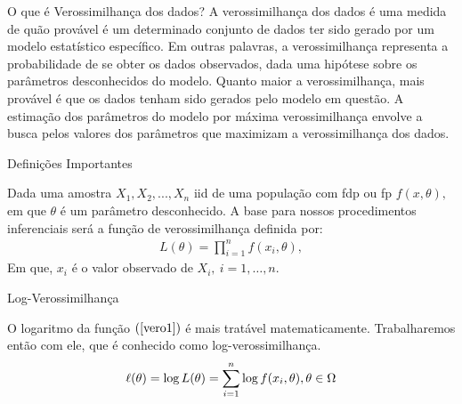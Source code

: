 \documentclass[12pt]{beamer}
\begin{document}
\begin{frame}{}
    \begin{block}{O que é Verossimilhança dos dados?}
    \justifying
A verossimilhança dos dados é uma medida de quão provável é um determinado conjunto de dados ter sido gerado por um modelo estatístico específico. Em outras palavras, a verossimilhança representa a probabilidade de se obter os dados observados, dada uma hipótese sobre os parâmetros desconhecidos do modelo. Quanto maior a verossimilhança, mais provável é que os dados tenham sido gerados pelo modelo em questão. A estimação dos parâmetros do modelo por máxima verossimilhança envolve a busca pelos valores dos parâmetros que maximizam a verossimilhança dos dados.
\end{block}
\end{frame}

\begin{frame}{Definições Importantes}
\begin{definicao}\label{def5}
    Dada uma amostra $X_1, X_2, ..., X_n$ iid de uma população com fdp ou fp $f(x,\theta),$ em que $\theta$ é um parâmetro desconhecido. A base para nossos procedimentos inferenciais será a função de verossimilhança definida por:
    \begin{align}\label{vero1}
    L(\theta)=\displaystyle{\prod_{i=1}^{n}f(x_{i},\theta)},
    \end{align}
Em que, $x_{i}$ é o valor observado de $X_{i},~i=1,\ldots, n.$
\end{definicao}
\end{frame}

\begin{frame}{Log-Verossimilhança}
\begin{block}{}
\justifying
O logaritmo da função $(\ref{vero1})$ é mais tratável matematicamente. Trabalharemos então com ele, que é conhecido como log-verossimilhança.
\begin{align*}
    \ell(\theta)=\log{L(\theta)}={\displaystyle \sum_{i=1}^{n}} \log{f(x_{i},\theta)},\theta\in \Omega
\end{align*}
\end{block}
\end{frame}
\end{document}
